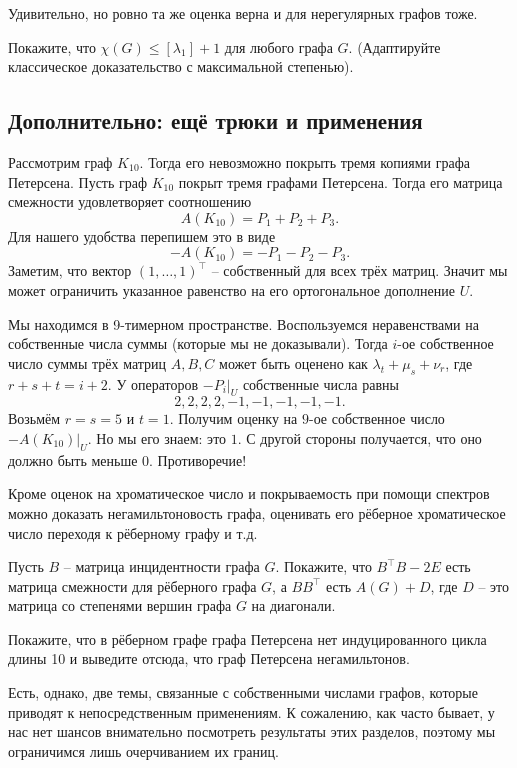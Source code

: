 \rm Удивительно, но ровно та же оценка верна и для нерегулярных графов тоже.
\erm

\zd Покажите, что $\chi(G) \leq [\lambda_1]+1$ для любого графа $G$. (Адаптируйте классическое доказательство с максимальной степенью).
\ezd


\subsection{Дополнительно: ещё трюки и применения}

\thrm Рассмотрим граф $K_{10}$. Тогда его невозможно покрыть тремя копиями графа Петерсена.
\ethrm
\proof Пусть граф $K_{10}$ покрыт тремя графами Петерсена. Тогда его матрица смежности удовлетворяет соотношению 
$$A(K_{10})=P_1+P_2+P_3.$$
Для нашего удобства перепишем это в виде 
$$-A(K_{10})=-P_1-P_2-P_3.$$
Заметим, что вектор $(1,\dots,1)^\top$ -- собственный для всех трёх матриц. Значит мы может ограничить указанное равенство на его ортогональное дополнение $U$.

Мы находимся в 9-тимерном пространстве. Воспользуемся неравенствами на собственные числа суммы (которые мы не доказывали). Тогда $i$-ое собственное число  суммы трёх матриц $A,B,C$ может быть оценено как $\lambda_t +\mu_s+ \nu_r$, где $r+s+t=i+2$. У операторов $-P_i|_U$ собственные числа равны $$2,2,2,2,-1,-1,-1,-1,-1.$$
Возьмём  $r=s=5$ и $t=1$. Получим оценку на $9$-ое собственное число $-A(K_{10})|_U$. Но мы его знаем: это $1$. С другой стороны получается, что оно должно быть меньше $0$. Противоречие! 
\endproof

Кроме оценок на хроматическое число и покрываемость при помощи спектров можно доказать негамильтоновость графа, оценивать его рёберное хроматическое число переходя к рёберному графу и т.д.

\zd Пусть $B$ -- матрица инцидентности графа $G$. Покажите, что $B^\top B - 2 E$ есть матрица смежности для рёберного графа $G$, а $B B^\top$ есть $A(G)+D$, где $D$ -- это матрица со степенями вершин графа $G$ на диагонали. 
\ezd

\zd Покажите, что в рёберном графе графа Петерсена нет индуцированного цикла длины 10 и выведите отсюда, что граф Петерсена негамильтонов.
\ezd

Есть, однако, две темы, связанные с собственными числами графов, которые приводят к непосредственным применениям. К сожалению, как часто бывает, у нас нет шансов внимательно посмотреть результаты этих разделов, поэтому мы ограничимся лишь очерчиванием их границ.




